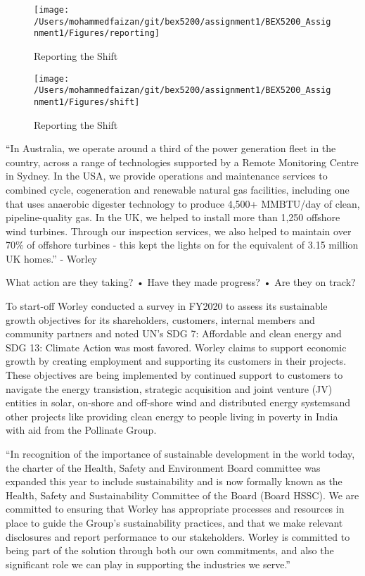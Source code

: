 \documentclass[11pt,a4paper,]{article}
\begin{document}
\begin{figure}

{\centering \texttt{[image: /Users/mohammedfaizan/git/bex5200/assignment1/BEX5200\_Assignment1/Figures/reporting]} 

}

\caption{Reporting the Shift}\label{fig:unnamed-chunk-1-1}
\end{figure}
\begin{figure}

{\centering \texttt{[image: /Users/mohammedfaizan/git/bex5200/assignment1/BEX5200\_Assignment1/Figures/shift]} 

}

\caption{Reporting the Shift}\label{fig:unnamed-chunk-1-2}
\end{figure}

``In Australia, we operate around a third of the power generation fleet in the country, across a range of technologies supported by a Remote Monitoring Centre in Sydney.
In the USA, we provide operations and maintenance services to combined cycle, cogeneration and renewable natural gas facilities, including one that uses anaerobic digester technology to produce 4,500+ MMBTU/day of clean, pipeline-quality gas.
In the UK, we helped to install more than 1,250 offshore wind turbines. Through our inspection services, we also helped to maintain over 70\% of offshore turbines - this kept the lights on for the equivalent of 3.15 million UK homes.'' - Worley

What action are they taking? • Have they made progress?
• Are they on track?

To start-off Worley conducted a survey in FY2020 to assess its sustainable growth objectives for its shareholders, customers, internal members and community partners and noted UN's SDG 7: Affordable and clean energy and SDG 13: Climate Action was most favored. Worley claims to support economic growth by creating employment and supporting its customers in their projects. These objectives are being implemented by continued support to customers to navigate the energy transistion, strategic acquisition and joint venture (JV) entities in solar, on-shore and off-shore wind and distributed energy systemsand other projects like providing clean energy to people living in poverty in India with aid from the Pollinate Group.

``In recognition of the importance of sustainable development in the world today, the charter of the Health, Safety and Environment Board committee was expanded this year to include sustainability and is now formally known as the Health, Safety and Sustainability Committee of the Board (Board HSSC).
We are committed to ensuring that Worley has appropriate processes and resources in place to guide the Group's sustainability practices, and that we make relevant disclosures and report performance to our stakeholders.
Worley is committed to being part of the solution through both our own commitments, and also the significant role we can play in supporting the industries we serve.''
\end{document}
